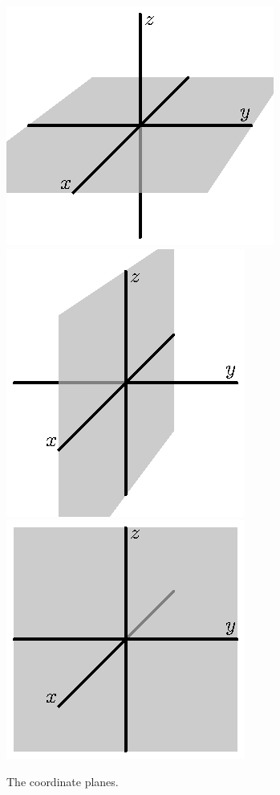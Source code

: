 \begin{figure}[ht]
\begin{center}
  \includegraphics{figures/fig_9_1_xy_plane.eps}
\hspace{0.2in}
  \includegraphics{figures/fig_9_1_xz_plane.eps}
\hspace{0.3in}
  \includegraphics{figures/fig_9_1_yz_plane.eps}
\end{center}
\caption{The coordinate planes.}
\label{F:9.1.coordinate_planes}
\end{figure}

